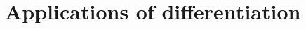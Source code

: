 \documentclass[../book/calcnotes.tex]{subfiles}
\begin{document}
\chapter{Applications of differentiation}
\label{sec:derivative-applications}
\end{document}
